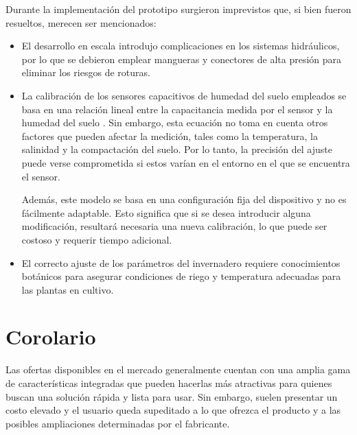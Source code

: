 Durante la implementación del prototipo surgieron imprevistos que, si bien fueron resueltos, merecen ser mencionados:
\begin{itemize}
\item El desarrollo en escala introdujo complicaciones en los sistemas hidráulicos, por lo que se debieron emplear mangueras y conectores de alta presión para eliminar los riesgos de roturas.

\item La calibración de los sensores capacitivos de humedad del suelo empleados se basa en una relación lineal entre la capacitancia medida por el sensor y la humedad del suelo \citep{soilcalibration}. Sin embargo, esta ecuación no toma en cuenta otros factores que pueden afectar la medición, tales como la temperatura, la salinidad y la compactación del suelo. Por lo tanto, la precisión del ajuste puede verse comprometida si estos varían en el entorno en el que se encuentra el sensor.

Además, este modelo se basa en una configuración fija del dispositivo y no es fácilmente adaptable. Esto significa que si se desea introducir alguna modificación, resultará necesaria una nueva calibración, lo que puede ser costoso y requerir tiempo adicional.

\item El correcto ajuste de los parámetros del invernadero requiere conocimientos botánicos para asegurar condiciones de riego y temperatura adecuadas para las plantas en cultivo. 
\end{itemize}


\section{Corolario}
Las ofertas disponibles en el mercado generalmente cuentan con una amplia gama de características integradas que pueden hacerlas más atractivas para quienes buscan una solución rápida y lista para usar. Sin embargo, suelen presentar un costo elevado y el usuario queda supeditado a lo que ofrezca el producto y a las posibles ampliaciones determinadas por el fabricante.


